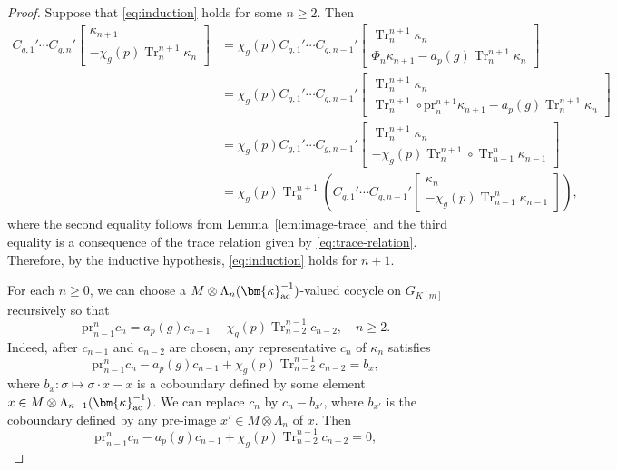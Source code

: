 \documentclass{amsart}
\numberwithin{equation}{section}
\newcommand{\pr}{\mathrm{pr}}
\newcommand{\Tr}{\operatorname{Tr}}
\newcommand{\ac}{\textup{ac}}
\newcommand{\bk}{(\bm{\kappa}_{\ac}^{-1})}
\begin{document}
\begin{proof}
Suppose that \eqref{eq:induction} holds for some $n\ge2$. Then
\begin{align*}
C_{g,1}'\cdots C_{g,n}'\begin{bmatrix}
    \kappa_{n+1}\\-\chi_g(p)\Tr_n^{n+1}\kappa_{n}
\end{bmatrix}&=\chi_g(p)C_{g,1}'\cdots C_{g,n-1}'\begin{bmatrix}
    \Tr_{n}^{n+1}\kappa_{n}\\
    \Phi_{n}\kappa_{n+1}-a_p(g)\Tr_{n}^{n+1}\kappa_{n}
\end{bmatrix}\\
    &=\chi_g(p)C_{g,1}'\cdots C_{g,n-1}'\begin{bmatrix}
    \Tr_{n}^{n+1}\kappa_{n}\\
    \Tr_{n}^{n+1}\circ\pr_n^{n+1}\kappa_{n+1}-a_p(g)\Tr_{n}^{n+1}\kappa_{n}
\end{bmatrix}\\
&=\chi_g(p)C_{g,1}'\cdots C_{g,n-1}'\begin{bmatrix}
    \Tr_{n}^{n+1}\kappa_n\\
    -\chi_g(p)\Tr_{n}^{n+1}\circ\Tr_{n-1}^{n}\kappa_{n-1}
\end{bmatrix}\\
&=\chi_g(p)\Tr_{n}^{n+1}\left(C_{g,1}'\cdots C_{g,n-1}'\begin{bmatrix}
    \kappa_{n}\\
    -\chi_g(p)\Tr_{n-1}^{n}\kappa_{n-1}
\end{bmatrix}\right),
\end{align*}
where the second equality follows from Lemma~\ref{lem:image-trace} and the third equality is a consequence of the trace relation given by \eqref{eq:trace-relation}.
Therefore, by the inductive hypothesis, \eqref{eq:induction} holds for $n+1$.

For each $n\ge0$, we can choose a $M\otimes\Lambda_n\bk$-valued cocycle on $G_{K[m]}$ recursively so that
\[
\pr^n_{n-1}c_n=a_p(g)c_{n-1}-\chi_g(p)\Tr_{n-2}^{n-1}c_{n-2},\quad n\ge2.
\]
Indeed, after $c_{n-1}$ and $c_{n-2}$ are chosen, any representative $c_n$ of $\kappa_n$ satisfies
\[
\pr^n_{n-1}c_n-a_p(g)c_{n-1}+\chi_g(p)\Tr_{n-2}^{n-1}c_{n-2}=b_x,
\]
where $b_x:\sigma\mapsto\sigma\cdot x-x$ is a coboundary defined by some element $x\in M\otimes\Lambda_{n-1}\bk$. We can replace $c_n$ by $c_n-b_{x'}$, where $b_{x'}$ is the coboundary defined by any pre-image $x'\in M\otimes\Lambda_n$ of $x$. Then
\begin{equation}
\label{eq:cocycle}\pr^n_{n-1}c_n-a_p(g)c_{n-1}+\chi_g(p)\Tr_{n-2}^{n-1}c_{n-2}=0,    
\end{equation}



\end{proof}
\end{document}
